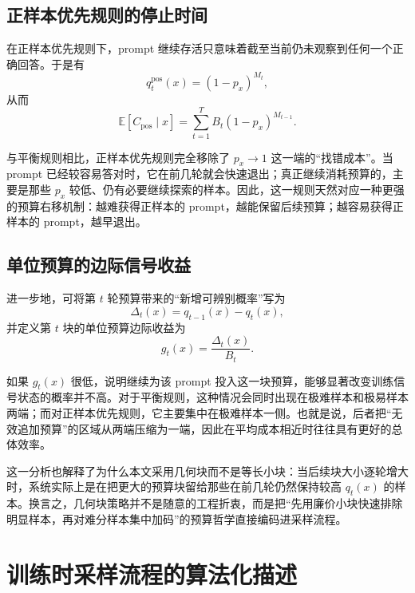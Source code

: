 \subsection{正样本优先规则的停止时间}

在正样本优先规则下，prompt 继续存活只意味着截至当前仍未观察到任何一个正确回答。于是有
\begin{equation}
    q_t^{\mathrm{pos}}(x)=(1-p_x)^{M_t},
\end{equation}
从而
\begin{equation}
    \mathbb{E}[C_{\mathrm{pos}}\mid x]=\sum_{t=1}^{T}B_t(1-p_x)^{M_{t-1}}.
\end{equation}

与平衡规则相比，正样本优先规则完全移除了 $p_x\rightarrow 1$ 这一端的“找错成本”。当 prompt 已经较容易答对时，它在前几轮就会快速退出；真正继续消耗预算的，主要是那些 $p_x$ 较低、仍有必要继续探索的样本。因此，这一规则天然对应一种更强的预算右移机制：越难获得正样本的 prompt，越能保留后续预算；越容易获得正样本的 prompt，越早退出。

\subsection{单位预算的边际信号收益}

进一步地，可将第 $t$ 轮预算带来的“新增可辨别概率”写为
\begin{equation}
    \Delta_t(x)=q_{t-1}(x)-q_t(x),
\end{equation}
并定义第 $t$ 块的单位预算边际收益为
\begin{equation}
    g_t(x)=\frac{\Delta_t(x)}{B_t}.
\end{equation}

如果 $g_t(x)$ 很低，说明继续为该 prompt 投入这一块预算，能够显著改变训练信号状态的概率并不高。对于平衡规则，这种情况会同时出现在极难样本和极易样本两端；而对正样本优先规则，它主要集中在极难样本一侧。也就是说，后者把“无效追加预算”的区域从两端压缩为一端，因此在平均成本相近时往往具有更好的总体效率。

这一分析也解释了为什么本文采用几何块而不是等长小块：当后续块大小逐轮增大时，系统实际上是在把更大的预算块留给那些在前几轮仍然保持较高 $q_t(x)$ 的样本。换言之，几何块策略并不是随意的工程折衷，而是把“先用廉价小块快速排除明显样本，再对难分样本集中加码”的预算哲学直接编码进采样流程。

\section{训练时采样流程的算法化描述}

